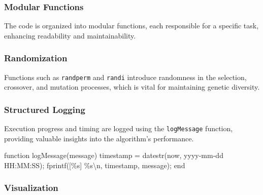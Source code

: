 \documentclass[
  letterpaper,
  DIV=11,
  numbers=noendperiod]{scrartcl}
\newenvironment{Shaded}{\begin{snugshade}}{\end{snugshade}}
\newcommand{\KeywordTok}[1]{\textcolor[rgb]{0.00,0.23,0.31}{#1}}
\newcommand{\NormalTok}[1]{\textcolor[rgb]{0.00,0.23,0.31}{#1}}
\newcommand{\OperatorTok}[1]{\textcolor[rgb]{0.37,0.37,0.37}{#1}}
\newcommand{\SpecialStringTok}[1]{\textcolor[rgb]{0.13,0.47,0.30}{#1}}
\newcommand{\VariableTok}[1]{\textcolor[rgb]{0.07,0.07,0.07}{#1}}
\begin{document}
\subsubsection{Modular Functions}\label{modular-functions}

The code is organized into modular functions, each responsible for a
specific task, enhancing readability and maintainability.

\subsubsection{Randomization}\label{randomization}

Functions such as \texttt{randperm} and \texttt{randi} introduce
randomness in the selection, crossover, and mutation processes, which is
vital for maintaining genetic diversity.

\subsubsection{Structured Logging}\label{structured-logging}

Execution progress and timing are logged using the \texttt{logMessage}
function, providing valuable insights into the algorithm's performance.

\begin{Shaded}
\begin{Highlighting}[]
\KeywordTok{function} \VariableTok{logMessage}\NormalTok{(}\VariableTok{message}\NormalTok{)}
    \VariableTok{timestamp} \OperatorTok{=} \VariableTok{datestr}\NormalTok{(}\VariableTok{now}\OperatorTok{,} \SpecialStringTok{\textquotesingle{}yyyy{-}mm{-}dd HH:MM:SS\textquotesingle{}}\NormalTok{)}\OperatorTok{;}
    \VariableTok{fprintf}\NormalTok{(}\SpecialStringTok{\textquotesingle{}[\%s] \%s\textbackslash{}n\textquotesingle{}}\OperatorTok{,} \VariableTok{timestamp}\OperatorTok{,} \VariableTok{message}\NormalTok{)}\OperatorTok{;}
\KeywordTok{end}
\end{Highlighting}
\end{Shaded}

\subsubsection{Visualization}\label{visualization}
\end{document}
